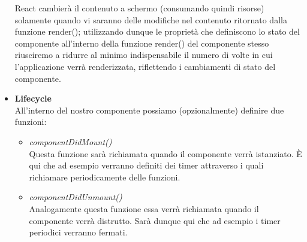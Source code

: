 \begin{itemize}
    React cambierà il contenuto a schermo (consumando quindi risorse) solamente quando vi saranno delle modifiche nel contenuto ritornato dalla funzione render(); utilizzando dunque le proprietà che definiscono lo stato del componente all'interno della funzione render() del componente stesso riusciremo a ridurre al minimo indispensabile il numero di volte in cui l'applicazione verrà renderizzata, riflettendo i cambiamenti di stato del componente.    
    \vspace{10mm}
    \item \textbf{Lifecycle}\\
    All'interno del nostro componente possiamo (opzionalmente) definire due funzioni:
    \begin{itemize}
      \item \emph{componentDidMount()}\\
      Questa funzione sarà richiamata quando il componente verrà istanziato.\newline
      È qui che ad esempio verranno definiti dei timer attraverso i quali richiamare periodicamente delle funzioni.
      \item \emph{componentDidUnmount()}\\
      Analogamente questa funzione essa verrà richiamata quando il componente verrà distrutto.\newline
      Sarà dunque qui che ad esempio i timer periodici verranno fermati.
    \end{itemize}

\end{itemize}
